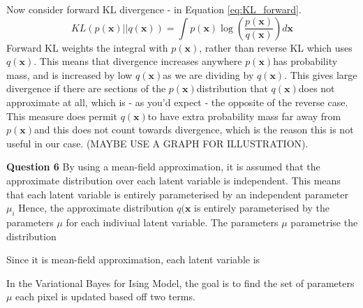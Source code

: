 \documentclass[10pt, a4paper, twocolumn]{article} %
\def \qx   {$q(\textbf{x})$}
\def \px   {$p(\textbf{x})$}
\begin{document}
Now consider forward KL divergence - in Equation \ref{eq:KL_forward}.
\begin{equation}
     KL(p(\mathbf{x})||q(\mathbf{x})) = \int p(\mathbf{x})\log\left(\frac{p(\mathbf{x})}{q(\mathbf{x})}\right)d\textbf{x}
     \label{eq:KL_forward}
\end{equation}
Forward KL weights the integral with \px, rather than reverse KL which uses \qx. This means that divergence increases anywhere \px has probability mass, and is increased by low \qx as we are dividing by \qx. This gives large divergence if there are sections of the \px distribution that \qx does not approximate at all, which is - as you'd expect - the opposite of the reverse case. This measure does permit \qx to have extra probability mass far away from \px and this does not count towards divergence, which is the reason this is not useful in our case. (MAYBE USE A GRAPH FOR ILLUSTRATION).




\textbf{Question 6} By using a mean-field approximation, it is assumed that the approximate distribution over each latent variable is independent. This means that each latent variable is entirely parameterised by an independent parameter $\mu_i$
Hence, the approximate distribution $q(\mathbf{x}$ is entirely parameterised by the parameters $\mu$ for each indiviual latent variable. The parameters $\mu$ parametrise the distribution

Since it is mean-field approximation, each latent variable is 

In the Variational Bayes for Ising Model, the goal is to find the set of parameters $\mu$  each pixel is updated based off two terms.
\end{document}
